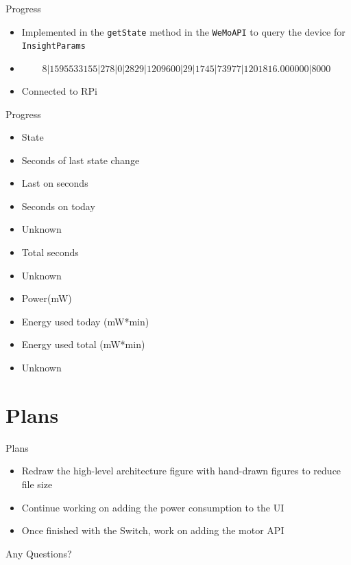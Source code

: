 \documentclass{beamer}
\begin{document}
\begin{frame}{Progress}{}
	\begin{itemize}
		\item Implemented in the \texttt{getState} method in the \texttt{WeMoAPI} to query the device for \texttt{InsightParams}
		\item 		\[8 \vert 1595533155 \vert 278 \vert 0 \vert 2829 \vert 1209600 \vert 29 \vert 1745 
		\vert 73977 \vert 1201816.000000 \vert 8000
		\] 
		\item Connected to RPi
	\end{itemize}
\end{frame}

\begin{frame}{Progress}{}
\begin{itemize}
\item State
\item Seconds of last state change
\item Last on seconds
\item Seconds on today
\item Unknown
\item Total seconds
\item Unknown
\item Power(mW)
\item Energy used today (mW*min)
\item Energy used total (mW*min)
\item Unknown
\end{itemize}
\end{frame}


\section{Plans}
\begin{frame}{Plans}{}
\begin{itemize}
	\item Redraw the high-level architecture figure with hand-drawn figures to reduce file size
	\item Continue working on adding the power consumption to the UI 
	\item Once finished with the Switch, work on adding the motor API
\end{itemize}
\end{frame}
\begin{frame}
\Huge
\center
Any Questions?
\end{frame}
\end{document}
